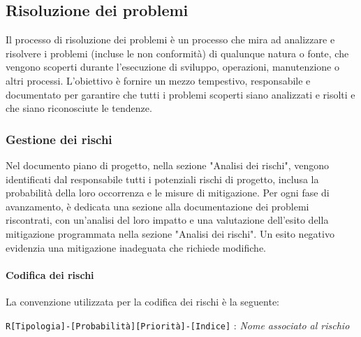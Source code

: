 \subsection{Risoluzione dei problemi}
Il processo di risoluzione dei problemi è un processo che mira ad analizzare e risolvere i problemi (incluse le non conformità) di qualunque natura o fonte, che vengono scoperti durante l'esecuzione di sviluppo, operazioni, manutenzione o altri processi.
L'obiettivo è fornire un mezzo tempestivo, responsabile e documentato per garantire che tutti i problemi scoperti siano analizzati e risolti e che siano riconosciute le tendenze.

\subsubsection{Gestione dei rischi}
Nel documento piano di progetto, nella sezione "Analisi dei rischi", vengono identificati dal responsabile tutti i potenziali rischi di progetto, inclusa la probabilità della loro occorrenza e le misure di mitigazione. Per ogni fase di avanzamento, è dedicata una sezione alla documentazione dei problemi riscontrati, con un'analisi del loro impatto e una valutazione dell'esito della mitigazione programmata nella sezione "Analisi dei rischi". Un esito negativo evidenzia una mitigazione inadeguata che richiede modifiche.

\paragraph{Codifica dei rischi}
La convenzione utilizzata per la codifica dei rischi è la seguente: 
\begin{center}
    \texttt{R[Tipologia]-[Probabilità][Priorità]-[Indice]} : \textit{Nome associato al rischio}
\end{center} 

